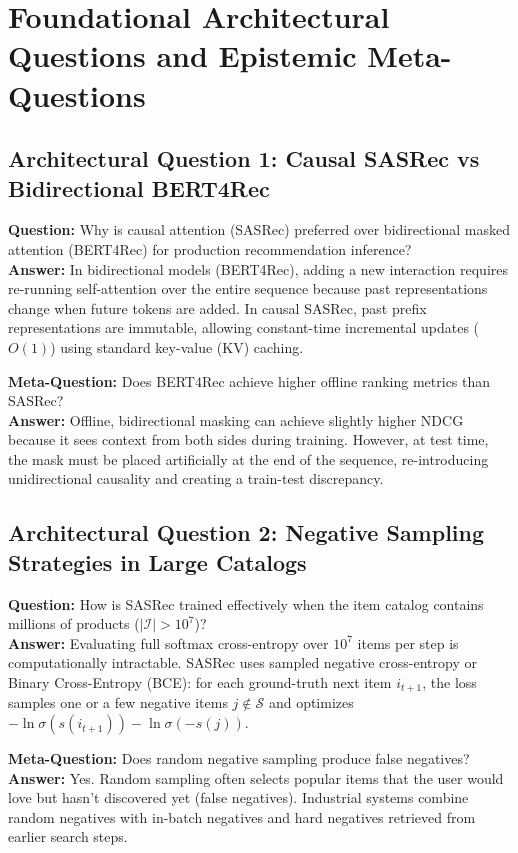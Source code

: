 \documentclass[11pt,a4paper]{article}
\theoremstyle{definition}
\begin{document}
\section{Foundational Architectural Questions and Epistemic Meta-Questions}

\subsection{Architectural Question 1: Causal SASRec vs Bidirectional BERT4Rec}
\textbf{Question:} Why is causal attention (SASRec) preferred over bidirectional masked attention (BERT4Rec) for production recommendation inference?\\
\textbf{Answer:} In bidirectional models (BERT4Rec), adding a new interaction requires re-running self-attention over the entire sequence because past representations change when future tokens are added. In causal SASRec, past prefix representations are immutable, allowing constant-time incremental updates ($O(1)$) using standard key-value (KV) caching.

\textbf{Meta-Question:} Does BERT4Rec achieve higher offline ranking metrics than SASRec?\\
\textbf{Answer:} Offline, bidirectional masking can achieve slightly higher NDCG because it sees context from both sides during training. However, at test time, the mask must be placed artificially at the end of the sequence, re-introducing unidirectional causality and creating a train-test discrepancy.

\subsection{Architectural Question 2: Negative Sampling Strategies in Large Catalogs}
\textbf{Question:} How is SASRec trained effectively when the item catalog contains millions of products ($|\mathcal{I}| > 10^7$)?\\
\textbf{Answer:} Evaluating full softmax cross-entropy over $10^7$ items per step is computationally intractable. SASRec uses sampled negative cross-entropy or Binary Cross-Entropy (BCE): for each ground-truth next item $i_{t+1}$, the loss samples one or a few negative items $j \notin \mathcal{S}$ and optimizes $-\ln \sigma(s(i_{t+1})) - \ln \sigma(-s(j))$.

\textbf{Meta-Question:} Does random negative sampling produce false negatives?\\
\textbf{Answer:} Yes. Random sampling often selects popular items that the user would love but hasn't discovered yet (false negatives). Industrial systems combine random negatives with in-batch negatives and hard negatives retrieved from earlier search steps.
\end{document}

